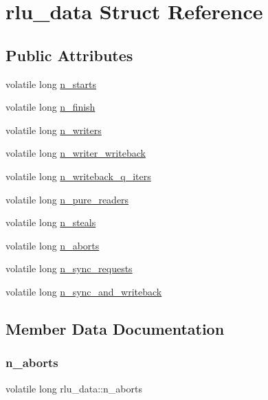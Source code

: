 \hypertarget{structrlu__data}{}\section{rlu\+\_\+data Struct Reference}
\label{structrlu__data}
\subsection*{Public Attributes}
\begin{DoxyCompactItemize}
\item 
volatile long \hyperlink{structrlu__data_a47cdee11c643fc21a0ed4ff3c99c83f5}{n\+\_\+starts}
\item 
volatile long \hyperlink{structrlu__data_afe8f0d726df8efb4b871e08afe046b80}{n\+\_\+finish}
\item 
volatile long \hyperlink{structrlu__data_a50cc86d68682a52c13e979cbd37c2ddc}{n\+\_\+writers}
\item 
volatile long \hyperlink{structrlu__data_ad9b1e2669cb1ae055b8e664970396773}{n\+\_\+writer\+\_\+writeback}
\item 
volatile long \hyperlink{structrlu__data_a8973689669ad7e42ab1794a481fc8a54}{n\+\_\+writeback\+\_\+q\+\_\+iters}
\item 
volatile long \hyperlink{structrlu__data_ab9b0b9f86c51d1255ea0a330f82d0478}{n\+\_\+pure\+\_\+readers}
\item 
volatile long \hyperlink{structrlu__data_a2aedd0e822eb8aafd069bbd8130938a9}{n\+\_\+steals}
\item 
volatile long \hyperlink{structrlu__data_a2e34cf67956adae258242b466aa16cf8}{n\+\_\+aborts}
\item 
volatile long \hyperlink{structrlu__data_a9267129ca04e951ccd56b3770dffa1c3}{n\+\_\+sync\+\_\+requests}
\item 
volatile long \hyperlink{structrlu__data_a402f1dc4cf7856c1c88cf529a232b614}{n\+\_\+sync\+\_\+and\+\_\+writeback}
\end{DoxyCompactItemize}


\subsection{Member Data Documentation}
\mbox{\label{structrlu__data_a2e34cf67956adae258242b466aa16cf8}} 
\subsubsection{\texorpdfstring{n\+\_\+aborts}{n\_aborts}}
{\footnotesize\ttfamily volatile long rlu\+\_\+data\+::n\+\_\+aborts}

